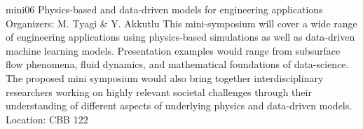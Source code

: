 \mini
{mini06}
{Physics-based and data-driven models for engineering applications}
{Organizers: M. Tyagi \& Y. Akkutlu}
{This mini-symposium will cover a wide range of engineering applications using physics-based simulations as well as data-driven machine learning models. Presentation examples would range from subsurface flow phenomena, fluid dynamics, and mathematical foundations of data-science. The proposed mini symposium would also bring together interdisciplinary researchers working on highly relevant societal challenges through their understanding of different aspects of underlying physics and data-driven models.}
{Location: CBB 122}

\begin{talks}
\item\talk
{}
{}
{}
\item\talk
{}
{}
{}
\item\talk
{}
{}
{}
\item\talk
{}
{}
{}
\end{talks}
\room
